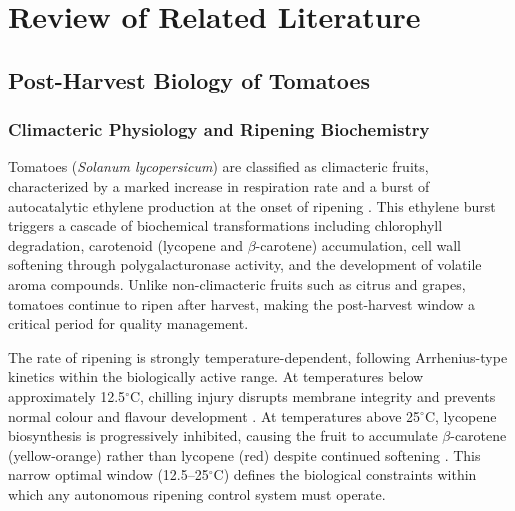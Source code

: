 
\chapter{Review of Related Literature}
    \label{ch:RRL}



\section{Post-Harvest Biology of Tomatoes}
    \label{sec:Postharvest Biology}

    \subsection{Climacteric Physiology and Ripening Biochemistry}

    Tomatoes (\textit{Solanum lycopersicum}) are classified as climacteric fruits, characterized by a marked increase in respiration rate and a burst of autocatalytic ethylene production at the onset of ripening \citep{prasad2018}. This ethylene burst triggers a cascade of biochemical transformations including chlorophyll degradation, carotenoid (lycopene and $\beta$-carotene) accumulation, cell wall softening through polygalacturonase activity, and the development of volatile aroma compounds. Unlike non-climacteric fruits such as citrus and grapes, tomatoes continue to ripen after harvest, making the post-harvest window a critical period for quality management.

    The rate of ripening is strongly temperature-dependent, following Arrhenius-type kinetics within the biologically active range. At temperatures below approximately 12.5$^{\circ}$C, chilling injury disrupts membrane integrity and prevents normal colour and flavour development \citep{saltveit2005}. At temperatures above 25$^{\circ}$C, lycopene biosynthesis is progressively inhibited, causing the fruit to accumulate $\beta$-carotene (yellow-orange) rather than lycopene (red) despite continued softening \citep{saltveit2005}. This narrow optimal window (12.5--25$^{\circ}$C) defines the biological constraints within which any autonomous ripening control system must operate.

